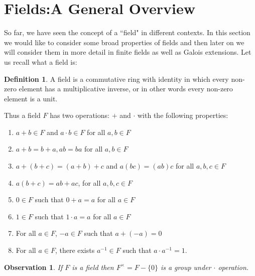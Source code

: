\documentclass[12pt]{article}
\theoremstyle{plain}
\newtheorem{observation}{Observation}
\theoremstyle{definition}
\newtheorem{definition}{Definition}
\theoremstyle{remark}
\begin{document}
\section{Fields:A General Overview}
So far, we have seen the concept of a ``field" in different contexts. In this section we would like to consider some broad properties of fields and then later on we will consider them in more detail in finite fields as well as Galois extensions. Let us recall what a field is:
\begin{definition}
A field is a commutative ring with identity in which every non-zero element has a multiplicative inverse, or in other words every non-zero element is a unit.
\end{definition}
Thus a field $F$ has two operations: $+$ and $\cdot$ with the following properties:
\begin{enumerate}
    \item $a+b\in F$ and $a\cdot b \in F$ for all $a,b\in F$
    \item $a+b=b+a, ab=ba$ for all $a,b\in F$
    \item $a+(b+c)=(a+b)+c$ and $a(bc) = (ab)c$ for all $a,b,c \in F$
    \item $a(b+c)=ab+ac$, for all $a,b,c \in F$
    \item $0\in F$ such that $0+a=a$ for all $a\in F$
    \item $1\in F$ such that $1\cdot a=a$ for all $a\in F$
    \item For all $a\in F$, $-a \in F$ such that $a+(-a)=0$
    \item For all $a \in F$, there exists $a^{-1}\in F$ such that $a\cdot a^{-1}=1$.
\end{enumerate}

\begin{observation}
If  $F$ is a field then $F^{\times} = F-\{0\}$ is a group under $\cdot$ operation.
\end{observation}
\end{document}
